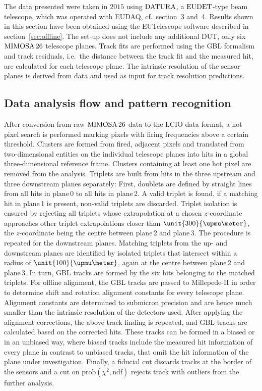 
The data presented were taken in $2015$ using $\textrm{DATURA}$, a $\textrm{EUDET}$-type beam telescope, which was operated with EUDAQ, cf.~section~3 and~4. 
Results shown in this section have been obtained using the EUTelescope software described in section~\ref{sec:offline}. 
The set-up does not include any additional DUT, only six $\textrm{MIMOSA\,26}$ telescope planes. 
Track fits are performed using the GBL formalism and track residuals, i.e.\ the distance between the track fit and the measured hit,
 are calculated for each telescope plane. 
The intrinsic resolution of the sensor planes is derived from data and used as input for track resolution predictions. 
 

\subsection{Data analysis flow and pattern recognition}
\label{sec:datura-nodut}

After conversion from raw $\textrm{MIMOSA\,26}$ data to the LCIO data format, a hot pixel search is performed marking pixels with firing frequencies above a certain threshold.
Clusters are formed from fired, adjacent pixels and translated from two-dimensional entities on the individual telescope planes into hits in a global three-dimensional reference frame.
Clusters containing at least one hot pixel are removed from the analysis. 
Triplets are built from hits in the three upstream and three downstream planes separately: 
First, doublets are defined by straight lines from all hits in plane\,0 to all hits in plane\,2. 
A valid triplet is found, if a matching hit in plane\,1 is present, non-valid triplets are discarded.  
Triplet isolation is ensured by rejecting all triplets whose extrapolation at a chosen $z$-coordinate approaches other triplet extrapolations closer than $\unit{300}{\upmu\meter}$,
 the $z$-coordinate being the centre between plane\,2 and plane\,3. 
The procedure is repeated for the downstream planes. 
Matching triplets from the up- and downstream planes are identified by isolated triplets that intersect within a radius of $\unit{100}{\upmu\meter}$, again at the centre between plane\,2 and plane\,3. 
In turn, GBL tracks are formed by the six hits belonging to the matched triplets. 
For offline alignment, the GBL tracks are passed to \mbox{Millepede-II} in order to determine shift and rotation alignment constants for every telescope plane.
Alignment constants are determined to submicron precision and are hence much smaller than the intrinsic resolution of the detectors used. 
After applying the alignment corrections, the above track finding is repeated, and GBL tracks are calculated based on the corrected hits. 
These tracks can be formed in a \textrm{biased} or in an \textrm{unbiased} way, where biased tracks include the measured hit information of every plane in contrast to unbiased tracks,
 that omit the hit information of the plane under investigation. 
Finally, a fiducial cut discards tracks at the border of the sensors and a cut on $\textrm{prob}(\chi^2,\textrm{ndf})$ rejects track with outliers from the further analysis. 


